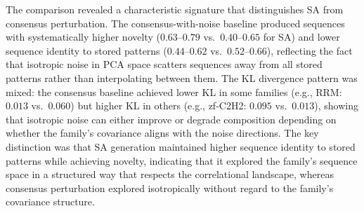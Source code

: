 \documentclass[10pt]{article}
\begin{document}
The comparison revealed a characteristic signature that distinguishes SA from consensus perturbation. The consensus-with-noise baseline produced sequences with systematically higher novelty ($0.63$--$0.79$ vs.\ $0.40$--$0.65$ for SA) and lower sequence identity to stored patterns ($0.44$--$0.62$ vs.\ $0.52$--$0.66$), reflecting the fact that isotropic noise in PCA space scatters sequences away from all stored patterns rather than interpolating between them. The KL divergence pattern was mixed: the consensus baseline achieved lower KL in some families (e.g., RRM: $0.013$ vs.\ $0.060$) but higher KL in others (e.g., zf-C2H2: $0.095$ vs.\ $0.013$), showing that isotropic noise can either improve or degrade composition depending on whether the family's covariance aligns with the noise directions. The key distinction was that SA generation maintained higher sequence identity to stored patterns while achieving novelty, indicating that it explored the family's sequence space in a structured way that respects the correlational landscape, whereas consensus perturbation explored isotropically without regard to the family's covariance structure.
\end{document}
